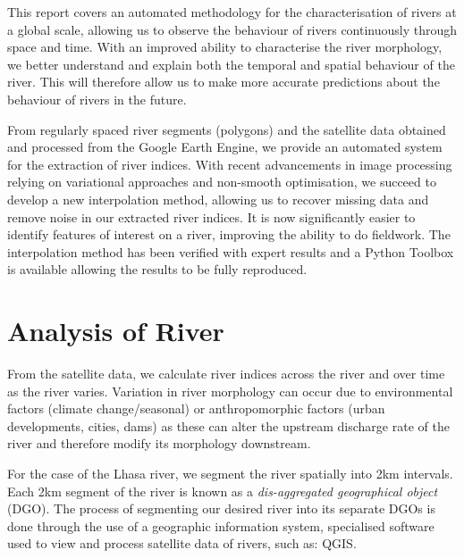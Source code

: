 \documentclass[12pt]{article}
\begin{document}
This report covers an automated methodology for the characterisation of rivers
at a global scale, allowing us to observe the behaviour of rivers continuously through space and time. With an improved ability to characterise the river morphology, we better understand and explain both the temporal and spatial behaviour of the river. This will therefore allow us to make more accurate predictions about the behaviour of rivers in the future. 

From regularly spaced river segments (polygons) and the satellite data obtained and processed from the Google Earth Engine\cite{google-earth-engine}, we provide an automated system for the extraction of river indices. 
With recent advancements in image processing relying on variational approaches and non-smooth optimisation, we succeed to develop a new interpolation method, allowing us to recover missing data and remove noise in our extracted river indices.
It is now significantly easier to identify features of interest on a river, improving the ability to do fieldwork. The interpolation method has been verified with expert results and a Python Toolbox is available allowing the results to be fully reproduced.

\section{Analysis of River}
From the satellite data, we calculate river indices across the river and over time as the river varies. Variation in river morphology can occur due to environmental factors (climate change/seasonal) or anthropomorphic factors (urban developments, cities, dams) as these can alter the upstream discharge rate of the river and therefore modify its morphology downstream. 

For the case of the Lhasa river, we segment the river spatially into
2km intervals. Each 2km segment of the river is known as a \emph{dis-aggregated geographical object} (DGO). The process\cite{gee-boothroyd} of segmenting our desired river into its separate DGOs is done through the use of a geographic information system, specialised software used to view and process satellite data of rivers, such as: QGIS\cite{qgis}. 
\end{document}
